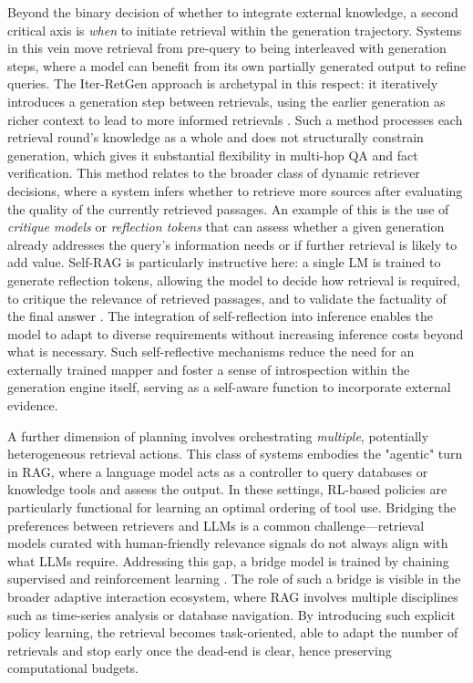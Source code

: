 \documentclass[11pt,a4paper]{article}
\begin{document}
Beyond the binary decision of whether to integrate external knowledge, a second critical axis is \emph{when} to initiate retrieval within the generation trajectory. Systems in this vein move retrieval from pre-query to being interleaved with generation steps, where a model can benefit from its own partially generated output to refine queries. The Iter-RetGen approach is archetypal in this respect: it iteratively introduces a generation step between retrievals, using the earlier generation as richer context to lead to more informed retrievals \cite{arxiv:2305.15294v2}. Such a method processes each retrieval round's knowledge as a whole and does not structurally constrain generation, which gives it substantial flexibility in multi-hop QA and fact verification. This method relates to the broader class of dynamic retriever decisions, where a system infers whether to retrieve more sources after evaluating the quality of the currently retrieved passages. An example of this is the use of \emph{critique models} or \emph{reflection tokens} that can assess whether a given generation already addresses the query's information needs or if further retrieval is likely to add value. Self-RAG is particularly instructive here: a single LM is trained to generate reflection tokens, allowing the model to decide how retrieval is required, to critique the relevance of retrieved passages, and to validate the factuality of the final answer \cite{arxiv:2310.11511v1}. The integration of self-reflection into inference enables the model to adapt to diverse requirements without increasing inference costs beyond what is necessary. Such self-reflective mechanisms reduce the need for an externally trained mapper and foster a sense of introspection within the generation engine itself, serving as a self-aware function to incorporate external evidence.

A further dimension of planning involves orchestrating \emph{multiple}, potentially heterogeneous retrieval actions. This class of systems embodies the "agentic" turn in RAG, where a language model acts as a controller to query databases or knowledge tools and assess the output. In these settings, RL-based policies are particularly functional for learning an optimal ordering of tool use. Bridging the preferences between retrievers and LLMs is a common challenge---retrieval models curated with human-friendly relevance signals do not always align with what LLMs require. Addressing this gap, a bridge model is trained by chaining supervised and reinforcement learning \cite{arxiv:2401.06954v2}. The role of such a bridge is visible in the broader adaptive interaction ecosystem, where RAG involves multiple disciplines such as time-series analysis or database navigation. By introducing such explicit policy learning, the retrieval becomes task-oriented, able to adapt the number of retrievals and stop early once the dead-end is clear, hence preserving computational budgets.
\end{document}
